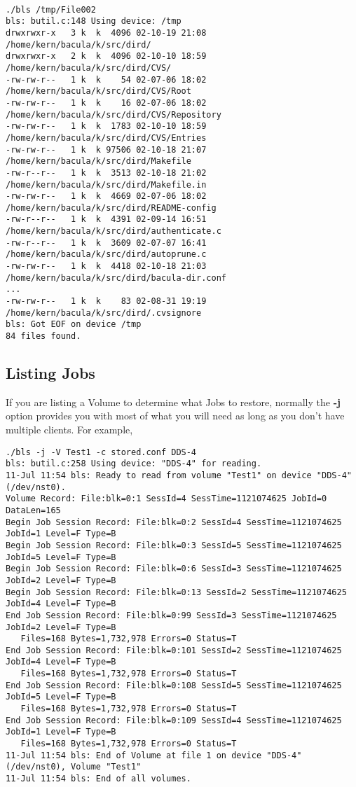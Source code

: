 \footnotesize
\begin{verbatim}

./bls /tmp/File002
bls: butil.c:148 Using device: /tmp
drwxrwxr-x   3 k  k  4096 02-10-19 21:08  /home/kern/bacula/k/src/dird/
drwxrwxr-x   2 k  k  4096 02-10-10 18:59  /home/kern/bacula/k/src/dird/CVS/
-rw-rw-r--   1 k  k    54 02-07-06 18:02  /home/kern/bacula/k/src/dird/CVS/Root
-rw-rw-r--   1 k  k    16 02-07-06 18:02  /home/kern/bacula/k/src/dird/CVS/Repository
-rw-rw-r--   1 k  k  1783 02-10-10 18:59  /home/kern/bacula/k/src/dird/CVS/Entries
-rw-rw-r--   1 k  k 97506 02-10-18 21:07  /home/kern/bacula/k/src/dird/Makefile
-rw-r--r--   1 k  k  3513 02-10-18 21:02  /home/kern/bacula/k/src/dird/Makefile.in
-rw-rw-r--   1 k  k  4669 02-07-06 18:02  /home/kern/bacula/k/src/dird/README-config
-rw-r--r--   1 k  k  4391 02-09-14 16:51  /home/kern/bacula/k/src/dird/authenticate.c
-rw-r--r--   1 k  k  3609 02-07-07 16:41  /home/kern/bacula/k/src/dird/autoprune.c
-rw-rw-r--   1 k  k  4418 02-10-18 21:03  /home/kern/bacula/k/src/dird/bacula-dir.conf
...
-rw-rw-r--   1 k  k    83 02-08-31 19:19  /home/kern/bacula/k/src/dird/.cvsignore
bls: Got EOF on device /tmp
84 files found.
\end{verbatim}
\normalsize

\subsection{Listing Jobs}

If you are listing a Volume to determine what Jobs to restore, normally the
{\bf -j} option provides you with most of what you will need as long as you
don't have multiple clients. For example,

\footnotesize
\begin{verbatim}
./bls -j -V Test1 -c stored.conf DDS-4
bls: butil.c:258 Using device: "DDS-4" for reading.
11-Jul 11:54 bls: Ready to read from volume "Test1" on device "DDS-4" (/dev/nst0).
Volume Record: File:blk=0:1 SessId=4 SessTime=1121074625 JobId=0 DataLen=165
Begin Job Session Record: File:blk=0:2 SessId=4 SessTime=1121074625 JobId=1 Level=F Type=B
Begin Job Session Record: File:blk=0:3 SessId=5 SessTime=1121074625 JobId=5 Level=F Type=B
Begin Job Session Record: File:blk=0:6 SessId=3 SessTime=1121074625 JobId=2 Level=F Type=B
Begin Job Session Record: File:blk=0:13 SessId=2 SessTime=1121074625 JobId=4 Level=F Type=B
End Job Session Record: File:blk=0:99 SessId=3 SessTime=1121074625 JobId=2 Level=F Type=B
   Files=168 Bytes=1,732,978 Errors=0 Status=T
End Job Session Record: File:blk=0:101 SessId=2 SessTime=1121074625 JobId=4 Level=F Type=B
   Files=168 Bytes=1,732,978 Errors=0 Status=T
End Job Session Record: File:blk=0:108 SessId=5 SessTime=1121074625 JobId=5 Level=F Type=B
   Files=168 Bytes=1,732,978 Errors=0 Status=T
End Job Session Record: File:blk=0:109 SessId=4 SessTime=1121074625 JobId=1 Level=F Type=B
   Files=168 Bytes=1,732,978 Errors=0 Status=T
11-Jul 11:54 bls: End of Volume at file 1 on device "DDS-4" (/dev/nst0), Volume "Test1"
11-Jul 11:54 bls: End of all volumes.
\end{verbatim}
\normalsize

